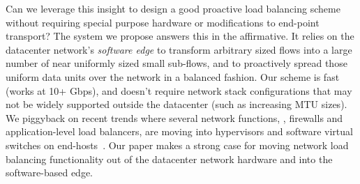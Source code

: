 Can we leverage this insight to design a good proactive load balancing scheme without requiring special purpose hardware or modifications to end-point transport? The system we propose answers this in the affirmative. It relies on the datacenter network's {\em software edge} to transform arbitrary sized flows into a large number of near uniformly sized small sub-flows, and to proactively spread those uniform data units over the network in a balanced fashion. Our scheme is fast (works at 10+ Gbps), and doesn't require network stack configurations that may not be widely supported outside the datacenter (such as increasing MTU sizes). We piggyback on recent trends where several network functions, \eg{}, firewalls and application-level load balancers, are moving into hypervisors and software virtual switches on end-hosts~\cite{nv-mtd,ovs-extending}. Our paper makes a strong case for moving network load balancing functionality out of the datacenter network hardware and into the software-based edge.


\iffalse
Fortunately, many commonly deployed network topologies like 2-tier folded Clos (leaf-spine) already meet the network symmetry 
requirements though asymmetry may occur due to failures and should be handled. The main challenge then is to achieve uniformity 
in flow sizes i.e. a mechanism that can efficiently multiplex and de-multiplex logical flows into a more uniformly sized smaller 
sub-flow units. This mapping and the load balancing of the resulting units should ideally be done 
in the network itself instead of transport layer.
\fi


